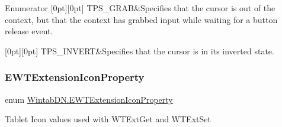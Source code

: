 \begin{DoxyEnumFields}{Enumerator}
[0pt][0pt]{}\mbox{\label{namespace_wintab_d_n_afe14d17b83fb34685a298d857c203caca611f4dc1a636ab77e3bbe6f078fea276}} 
T\+P\+S\+\_\+\+G\+R\+AB&Specifies that the cursor is out of the context, but that the context has grabbed input while waiting for a button release event. \\
\hline

[0pt][0pt]{}\mbox{\label{namespace_wintab_d_n_afe14d17b83fb34685a298d857c203caca7b360a1118406f2729a1bcc4074ddfdf}} 
T\+P\+S\+\_\+\+I\+N\+V\+E\+RT&Specifies that the cursor is in its inverted state. \\
\hline

\end{DoxyEnumFields}
\mbox{\label{namespace_wintab_d_n_a4fb4432ff158db77a634fed851e23f6f}} 
\subsubsection{\texorpdfstring{E\+W\+T\+Extension\+Icon\+Property}{EWTExtensionIconProperty}}
{\footnotesize\ttfamily enum \mbox{\hyperlink{namespace_wintab_d_n_a4fb4432ff158db77a634fed851e23f6f}{Wintab\+D\+N.\+E\+W\+T\+Extension\+Icon\+Property}}\hspace{0.3cm}{\ttfamily [strong]}}



Tablet Icon values used with W\+T\+Ext\+Get and W\+T\+Ext\+Set 

